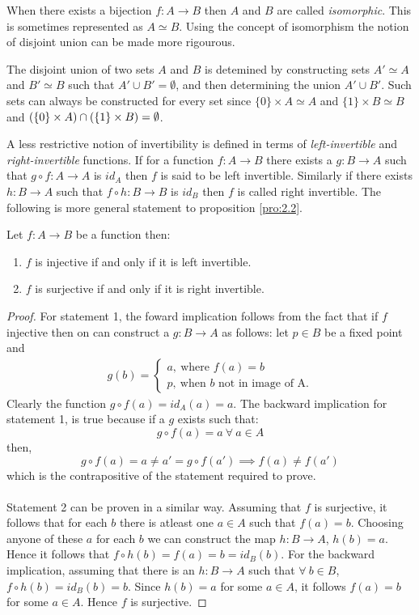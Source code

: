 When there exists a bijection $f:A\to B$ then $A$ and $B$ are called \textit{isomorphic}. This is sometimes represented as $A\simeq B$. Using the concept of isomorphism the notion of disjoint union can be made more rigourous.
\begin{definition}
  The disjoint union of two sets $A$ and $B$ is detemined by constructing sets $A'\simeq A$ and $B' \simeq B$ such that $A'\cup B' = \emptyset$, and then determining the union $A'\cup B'$. Such sets can always be constructed for every set since $\{0\}\times A \simeq A$ and $\{1\}\times B \simeq B$ and $\left(\{0\}\times A\right)\cap \left(\{1\}\times B\right) = \emptyset$.
\end{definition}
A less restrictive notion of invertibility is defined in terms of \textit{left-invertible} and \textit{right-invertible} functions. If for a function $f:A\to B$ there exists a $g:B\to A$ such that $g\circ f:A \to A$ is $id_A$ then $f$ is said to be left invertible. Similarly if there exists $h:B\to A$ such that $f\circ h:B\to B$ is $id_B$ then $f$ is called right invertible. The following is more general statement to proposition \ref{pro:2.2}.
\begin{proposition}
  Let $f:A\to B$ be a function then:
  \begin{enumerate}
    \item $f$ is injective if and only if it is left invertible.
    \item $f$ is surjective if and only if it is right invertible.
  \end{enumerate}
\end{proposition}
\begin{proof}
  For statement 1, the foward implication follows from the fact that if $f$ injective then on can construct a $g:B\to A$ as follows: let $p\in B$ be a fixed point and
  \begin{align}
    g(b) = \begin{cases}
             a,\ \text{where $f(a)=b$}\\
             p,\ \text{when $b$ not in image of A.}
           \end{cases}
  \end{align}
  Clearly the function $g\circ f(a) = id_A(a) = a$. The backward implication for statement 1, is true because if a $g$ exists such that:
  \[g\circ f(a) = a\ \forall\ a\in A\]
  then,
  \[g\circ f(a) = a \neq a' = g\circ f(a') \implies f(a) \neq f(a')\]
  which is the contrapositive of the statement required to prove.
  \paragraph{} Statement 2 can be proven in a similar way. Assuming that $f$ is surjective, it follows that for each $b$ there is atleast one $a\in A$ such that $f(a) = b$. Choosing anyone of these $a$ for each $b$ we can construct the map $h:B\to A$, $h(b) = a$. Hence it follows that $f\circ h(b) = f(a) = b = id_B(b)$. For the backward implication, assuming that there is an $h:B\to A$ such that $\forall\ b\in B$, $f\circ h(b) = id_B(b) = b$. Since $h(b) = a$ for some $a\in A$, it follows $f(a) = b$ for some $a\in A$. Hence $f$ is surjective.
\end{proof}
